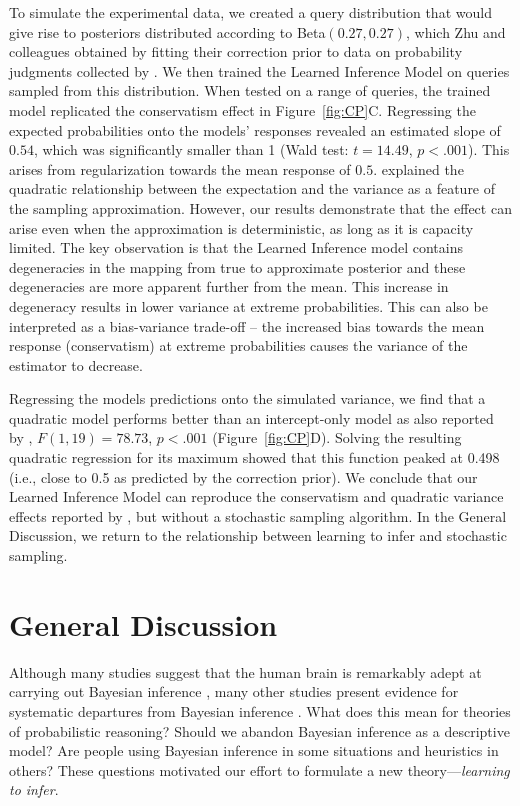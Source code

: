 To simulate the experimental data, we created a query distribution that would give rise to posteriors distributed according to Beta$(0.27,0.27)$, which Zhu and colleagues obtained by fitting their correction prior to data on probability judgments collected by \citet{stewart2006decision}. We then trained the Learned Inference Model on queries sampled from this distribution. When tested on a range of queries, the trained model replicated the conservatism effect in Figure~\ref{fig:CP}C. Regressing the expected probabilities onto the models' responses revealed an estimated slope of $0.54$, which was significantly smaller than 1 (Wald test: $t=14.49$, $p<.001$). This arises from regularization towards the mean response of $0.5$. \cite{zhu_sanborn_chater_2018} explained the quadratic relationship between the expectation and the variance as a feature of the sampling approximation. However, our results demonstrate that the effect can arise even when the approximation is deterministic, as long as it is capacity limited. The key observation is that the Learned Inference model contains degeneracies in the mapping from true to approximate posterior and these degeneracies are more apparent further from the mean. This increase in degeneracy results in lower variance at extreme probabilities. This can also be interpreted as a bias-variance trade-off \citep{geman1992neural} -- the increased bias towards the mean response (conservatism) at extreme probabilities causes the variance of the estimator to decrease.

Regressing the models predictions onto the simulated variance, we find that a quadratic model performs better than an intercept-only model as also reported by \cite{zhu_sanborn_chater_2018}, $F(1,19)=78.73$, $p<.001$ (Figure~\ref{fig:CP}D). Solving the resulting quadratic regression for its maximum showed that this function peaked at 0.498 (i.e., close to 0.5 as predicted by the correction prior). We conclude that our Learned Inference Model can reproduce the conservatism and quadratic variance effects reported by \cite{zhu_sanborn_chater_2018}, but without a stochastic sampling algorithm. In the General Discussion, we return to the relationship between learning to infer and stochastic sampling.

\section{General Discussion}

Although many studies suggest that the human brain is remarkably adept at carrying out Bayesian inference \citep[e.g.,][]{griffiths2006optimal,kording2006bayesian,knill1996perception,oaksford2007bayesian}, many other studies present evidence for systematic departures from Bayesian inference \citep[e.g.,][]{griffin1992weighing,benjamin18,kahneman1972subjective,kahneman1973psychology,grether1980bayes}. What does this mean for theories of probabilistic reasoning? Should we abandon Bayesian inference as a descriptive model? Are people using Bayesian inference in some situations and heuristics in others? These questions motivated our effort to formulate a new theory---\emph{learning to infer}.

